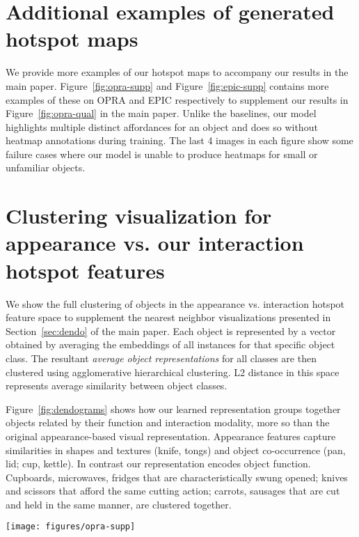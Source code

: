 \documentclass[10pt,twocolumn,letterpaper]{article}
\newcommand{\SC}[1]{{\textsc{#1}}}
\newcommand{\reffig}[1]{Figure~\ref{#1}}
\newcommand{\refsec}[1]{Section~\ref{#1}}
\begin{document}
\section{Additional examples of generated hotspot maps} \label{sec:examples}
We provide more examples of our hotspot maps to accompany our results in the main paper. \reffig{fig:opra-supp} and \reffig{fig:epic-supp} contains more examples of these on OPRA and EPIC respectively to supplement our results in \reffig{fig:opra-qual} in the main paper. Unlike the baselines, our model highlights multiple distinct affordances for an object and does so without heatmap annotations during training. The last 4 images in each figure show some failure cases where our model is unable to produce heatmaps for small or unfamiliar objects. 

\section{Clustering visualization for appearance vs. our interaction hotspot features} \label{sec:clustering}
We show the full clustering of objects in the appearance vs. interaction hotspot feature space to supplement the nearest neighbor visualizations presented in \refsec{sec:dendo} of the main paper. Each object is represented by a vector obtained by averaging the embeddings of all instances for that specific object class. The resultant \emph{average object representations} for all classes are then clustered using agglomerative hierarchical clustering. L2 distance in this space represents average similarity between object classes. 

\reffig{fig:dendograms} shows how our learned representation groups together objects related by their function and interaction modality, more so than the original appearance-based visual representation. Appearance features capture similarities in shapes and textures (knife, tongs) and object co-occurrence (pan, lid; cup, kettle). In contrast our representation encodes object function. Cupboards, microwaves, fridges that are characteristically swung opened; knives and scissors that afford the same cutting action; carrots, sausages that are cut and held in the same manner, are clustered together.

\begin{figure*}[t!]
\centering
\texttt{[image: figures/opra-supp]}
\caption{\textbf{Generated affordance heatmaps on inactive images from OPRA.} Our interaction hotspot maps show holdable, rotatable, and pushable regions (in red, green, and blue respectively). Saliency heatmaps do not discriminate between interactions and produce a single heatmap shown in yellow. Recall that the \SC{demo2vec} approach~\cite{fang2018demo2vec} is strongly supervised, whereas our approach is weakly supervised. Some failure cases due to small or unfamiliar objects can be seen in the last 4 examples.}
\label{fig:opra-supp}
\end{figure*}
\end{document}
